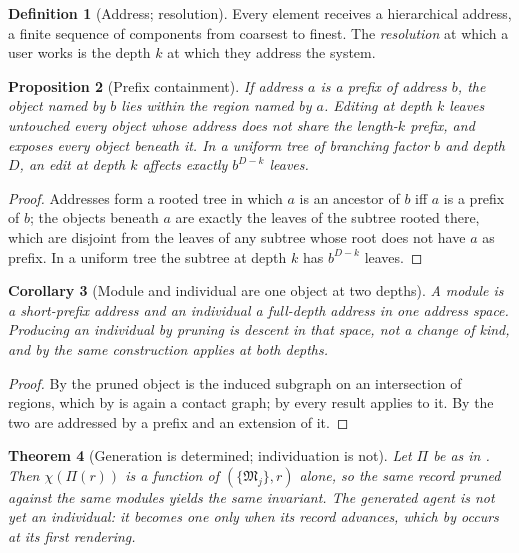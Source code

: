 \documentclass[11pt,a4paper]{article}
\theoremstyle{clstyle}
\newtheorem{theorem}{Theorem}[section]
\newtheorem{proposition}[theorem]{Proposition}
\newtheorem{corollary}[theorem]{Corollary}
\theoremstyle{definition}
\newtheorem{definition}[theorem]{Definition}
\theoremstyle{remark}
\newcommand{\Mod}{\mathfrak{M}}
\newcommand{\Char}{\chi}
\begin{document}
\begin{definition}[Address; resolution]
\label{def:resolution}
Every element receives a hierarchical address, a finite sequence of
components from coarsest to finest. The \emph{resolution} at which a user
works is the depth $k$ at which they address the system.
\end{definition}

\begin{proposition}[Prefix containment]
\label{prop:prefix}
If address $a$ is a prefix of address $b$, the object named by $b$ lies
within the region named by $a$. Editing at depth $k$ leaves untouched every
object whose address does not share the length-$k$ prefix, and exposes every
object beneath it. In a uniform tree of branching factor $b$ and depth $D$,
an edit at depth $k$ affects exactly $b^{D-k}$ leaves.
\end{proposition}

\begin{proof}
Addresses form a rooted tree in which $a$ is an ancestor of $b$ iff $a$ is a
prefix of $b$; the objects beneath $a$ are exactly the leaves of the subtree
rooted there, which are disjoint from the leaves of any subtree whose root
does not have $a$ as prefix. In a uniform tree the subtree at depth $k$ has
$b^{D-k}$ leaves.
\end{proof}

\begin{corollary}[Module and individual are one object at two depths]
\label{cor:two-depths}
A module is a short-prefix address and an individual a full-depth address in
one address space. Producing an individual by pruning is descent in that
space, not a change of kind, and by  the same construction
applies at both depths.
\end{corollary}

\begin{proof}
By  the pruned object is the induced subgraph on an
intersection of regions, which by  is again a contact graph;
by  every result applies to it. By  the
two are addressed by a prefix and an extension of it.
\end{proof}

\begin{theorem}[Generation is determined; individuation is not]
\label{thm:gen-determined}
Let $\Pi$ be as in . Then $\Char(\Pi(r))$ is a function of
$(\{\Mod_j\},r)$ alone, so the same record pruned against the same modules
yields the same invariant. The generated agent is not yet an individual: it
becomes one only when its record advances, which by  occurs at
its first rendering.
\end{theorem}
\end{document}
